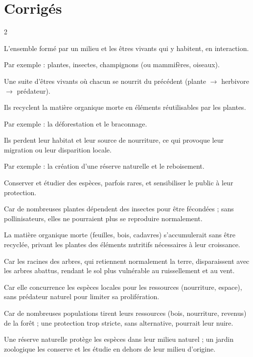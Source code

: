 \section{Corrigés}
\begin{multicols}{2}

L'ensemble formé par un milieu et les êtres vivants qui y habitent, en interaction.

Par exemple : plantes, insectes, champignons (ou mammifères, oiseaux).

Une suite d'êtres vivants où chacun se nourrit du précédent (plante $\to$ herbivore
$\to$ prédateur).

Ils recyclent la matière organique morte en éléments réutilisables par les plantes.

Par exemple : la déforestation et le braconnage.

Ils perdent leur habitat et leur source de nourriture, ce qui provoque leur migration
ou leur disparition locale.

Par exemple : la création d'une réserve naturelle et le reboisement.

Conserver et étudier des espèces, parfois rares, et sensibiliser le public à leur
protection.

Car de nombreuses plantes dépendent des insectes pour être fécondées ; sans
pollinisateurs, elles ne pourraient plus se reproduire normalement.

La matière organique morte (feuilles, bois, cadavres) s'accumulerait sans être
recyclée, privant les plantes des éléments nutritifs nécessaires à leur croissance.

Car les racines des arbres, qui retiennent normalement la terre, disparaissent avec
les arbres abattus, rendant le sol plus vulnérable au ruissellement et au vent.

Car elle concurrence les espèces locales pour les ressources (nourriture, espace),
sans prédateur naturel pour limiter sa prolifération.

Car de nombreuses populations tirent leurs ressources (bois, nourriture, revenus) de
la forêt ; une protection trop stricte, sans alternative, pourrait leur nuire.

Une réserve naturelle protège les espèces dans leur milieu naturel ; un jardin
zoologique les conserve et les étudie en dehors de leur milieu d'origine.


\end{multicols}
